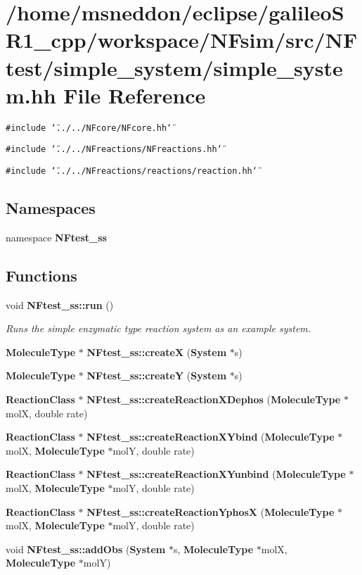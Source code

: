 \section{/home/msneddon/eclipse/galileoSR1\_\-cpp/workspace/NFsim/src/NFtest/simple\_\-system/simple\_\-system.hh File Reference}
\label{simple__system_8hh}


{\tt \#include \char`\"{}../../NFcore/NFcore.hh\char`\"{}}\par
{\tt \#include \char`\"{}../../NFreactions/NFreactions.hh\char`\"{}}\par
{\tt \#include \char`\"{}../../NFreactions/reactions/reaction.hh\char`\"{}}\par
\subsection*{Namespaces}
\begin{CompactItemize}
\item 
namespace {\bf NFtest\_\-ss}
\end{CompactItemize}
\subsection*{Functions}
\begin{CompactItemize}
\item 
void {\bf NFtest\_\-ss::run} ()
\begin{CompactList}\small\item\em Runs the simple enzymatic type reaction system as an example system. \item\end{CompactList}\item 
{\bf MoleculeType} $\ast$ {\bf NFtest\_\-ss::createX} ({\bf System} $\ast$s)
\item 
{\bf MoleculeType} $\ast$ {\bf NFtest\_\-ss::createY} ({\bf System} $\ast$s)
\item 
{\bf ReactionClass} $\ast$ {\bf NFtest\_\-ss::createReactionXDephos} ({\bf MoleculeType} $\ast$molX, double rate)
\item 
{\bf ReactionClass} $\ast$ {\bf NFtest\_\-ss::createReactionXYbind} ({\bf MoleculeType} $\ast$molX, {\bf MoleculeType} $\ast$molY, double rate)
\item 
{\bf ReactionClass} $\ast$ {\bf NFtest\_\-ss::createReactionXYunbind} ({\bf MoleculeType} $\ast$molX, {\bf MoleculeType} $\ast$molY, double rate)
\item 
{\bf ReactionClass} $\ast$ {\bf NFtest\_\-ss::createReactionYphosX} ({\bf MoleculeType} $\ast$molX, {\bf MoleculeType} $\ast$molY, double rate)
\item 
void {\bf NFtest\_\-ss::addObs} ({\bf System} $\ast$s, {\bf MoleculeType} $\ast$molX, {\bf MoleculeType} $\ast$molY)
\end{CompactItemize}
